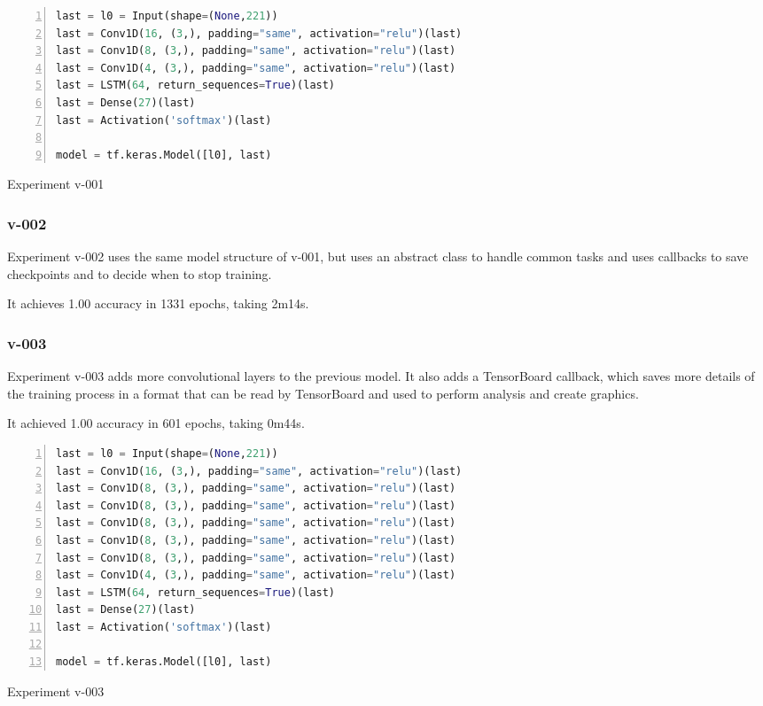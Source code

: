 \noindent
\begin{algorithm}
\begin{lstlisting}[language=Python, frame=single, numbers=left]
last = l0 = Input(shape=(None,221))
last = Conv1D(16, (3,), padding="same", activation="relu")(last)
last = Conv1D(8, (3,), padding="same", activation="relu")(last)
last = Conv1D(4, (3,), padding="same", activation="relu")(last)
last = LSTM(64, return_sequences=True)(last)
last = Dense(27)(last)
last = Activation('softmax')(last)

model = tf.keras.Model([l0], last)
\end{lstlisting}
\caption{\label{alg:v001}Experiment v-001}
\end{algorithm}

\subsubsection{v-002}
Experiment v-002 uses the same model structure of v-001, but uses an abstract class to handle common tasks and uses callbacks to save checkpoints and to decide when to stop training.

It achieves 1.00 accuracy in 1331 epochs, taking 2m14s.

\subsubsection{v-003}

Experiment v-003 adds more convolutional layers to the previous model.  It also adds a TensorBoard callback, which saves more details of the training process in a format that can be read by TensorBoard and used to perform analysis and create graphics.

It achieved 1.00 accuracy in 601 epochs, taking 0m44s.

\noindent
\begin{algorithm}
\begin{lstlisting}[language=Python, frame=single, numbers=left]
last = l0 = Input(shape=(None,221))
last = Conv1D(16, (3,), padding="same", activation="relu")(last)
last = Conv1D(8, (3,), padding="same", activation="relu")(last)
last = Conv1D(8, (3,), padding="same", activation="relu")(last)
last = Conv1D(8, (3,), padding="same", activation="relu")(last)
last = Conv1D(8, (3,), padding="same", activation="relu")(last)
last = Conv1D(8, (3,), padding="same", activation="relu")(last)
last = Conv1D(4, (3,), padding="same", activation="relu")(last)
last = LSTM(64, return_sequences=True)(last)
last = Dense(27)(last)
last = Activation('softmax')(last)

model = tf.keras.Model([l0], last)
\end{lstlisting}
\caption{\label{alg:v003}Experiment v-003}
\end{algorithm}

